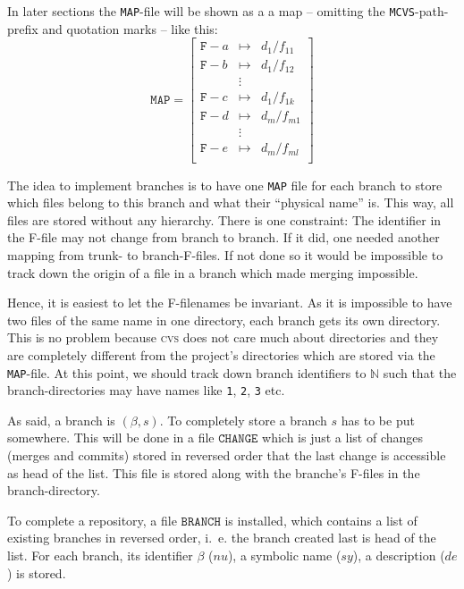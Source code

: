 \documentclass[fleqn, 10pt, a4paper]{report} \usepackage{amssymb}
\begin{document}
In later sections the \texttt{MAP}-file will be shown as a a map --
omitting the \texttt{MCVS}-path-prefix and quotation marks -- like
this:
\begin{displaymath}
  \mathtt{MAP} =\left[
    \begin{array}{lcl}
      \mathtt{F-}a &\mapsto& d_1/f_{11} \\
      \mathtt{F-}b &\mapsto& d_1/f_{12} \\
      &\vdots & \\
      \mathtt{F-}c &\mapsto& d_1/f_{1k} \\
      \mathtt{F-}d &\mapsto& d_m/f_{m1} \\
      &\vdots & \\
      \mathtt{F-}e &\mapsto& d_m/f_{ml} \\
    \end{array}\right]
\end{displaymath}

The idea to implement branches is to have one \texttt{MAP} file for
each branch to store which files belong to this branch and what their
``physical name'' is. This way, all files are stored without any
hierarchy. There is one constraint: The identifier in the F-file may
not change from branch to branch. If it did, one needed another
mapping from trunk- to branch-F-files. If not done so it would be
impossible to track down the origin of a file in a branch which made
merging impossible.

Hence, it is easiest to let the F-filenames be invariant. As it is
impossible to have two files of the same name in one directory, each
branch gets its own directory. This is no problem because \textsc{cvs}
does not care much about directories and they are completely different
from the project's directories which are stored via the
\texttt{MAP}-file.  At this point, we should track down branch
identifiers to $\mathbb{N}$ such that the branch-directories may have
names like \texttt{1}, \texttt{2}, \texttt{3} etc.

As said, a branch is $(\beta, s)$. To completely store a branch $s$
has to be put somewhere. This will be done in a file $\mathtt{CHANGE}$
which is just a list of changes (merges and commits) stored in
reversed order that the last change is accessible as head of the list.
This file is stored along with the branche's F-files in the
branch-directory.

To complete a repository, a file $\mathtt{BRANCH}$ is installed, which
contains a list of existing branches in reversed order, i.~e. the
branch created last is head of the list.  For each branch, its
identifier $\beta$ ($nu$), a symbolic name ($sy$), a description
($de$) is stored.
\end{document}
